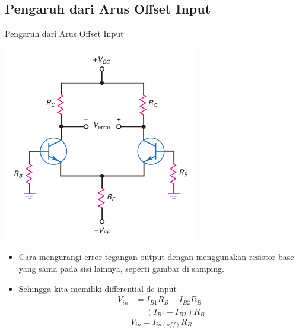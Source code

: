 \documentclass[aspectratio=169]{beamer}
\begin{document}
\subsection{Pengaruh dari Arus Offset Input}
\begin{frame}{Pengaruh dari Arus Offset Input}
	\begin{multicols}{2}
		\begin{center}
			\includegraphics[height=0.7\textheight]{gambar/01.equal_base_resistance_on_other_side_reduces_error}
		\end{center}
		\columnbreak
		\begin{itemize}
			\item Cara mengurangi error tegangan output dengan menggunakan resistor base yang sama pada sisi lainnya, seperti gambar di samping.
			\item Sehingga kita memiliki differential dc input
			\begin{align*}
				V_{in} &= I_{B1}R_B - I_{B2}R_B \\
				&= (I_{B1} - I_{B2})R_B				
			\end{align*}
			\begin{equation}
				V_{in} = I_{in(off)}R_B
			\end{equation}
		\end{itemize}
	\end{multicols}
\end{frame}
\end{document}
